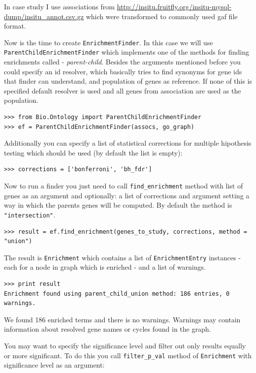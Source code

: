 \documentclass{report}
\begin{document}
In case study I use associations from \url{http://insitu.fruitfly.org/insitu-mysql-dump/insitu_annot.csv.gz}
which were transformed to commonly used gaf file format.

Now is the time to create \verb|EnrichmentFinder|. In this case we will
use \verb|ParentChildEnrichmentFinder| which implements one of the methods
for finding enrichments called - \emph{parent-child}. Besides the arguments
mentioned before you could specify an id resolver, which basically tries
to find synonyms for gene ids that finder can understand, and population
of genes as reference. If none of this is specified default resolver
is used and all genes from association are used as the population.

\begin{verbatim}
>>> from Bio.Ontology import ParentChildEnrichmentFinder
>>> ef = ParentChildEnrichmentFinder(assocs, go_graph)
\end{verbatim}

Additionally you can specify a list of statistical corrections for multiple
hipothesis testing which should be used (by default the list is empty):

\begin{verbatim}
>>> corrections = ['bonferroni', 'bh_fdr']
\end{verbatim}

Now to run a finder you just need to call \verb|find_enrichment| method with list
of genes as an argument and optionally: a list of corrections and argument
setting a way in which the parents genes will be computed. By default the method
is \verb|"intersection"|. 

\begin{verbatim}
>>> result = ef.find_enrichment(genes_to_study, corrections, method =  "union")
\end{verbatim}

The result is \verb|Enrichment| which contains a list of \verb|EnrichmentEntry|
instances - each for a node in graph which is enriched - and a list of warnings.

\begin{verbatim}
>>> print result
Enrichment found using parent_child_union method: 186 entries, 0 warnings.
\end{verbatim}

We found 186 enriched terms and there is no warnings. Warnings may contain
information about resolved gene names or cycles found in the graph.

You may want to specify the significance level and filter out only results
equally or more significant. To do this you call \verb|filter_p_val| method
of \verb|Enrichment| with significance level as an argument:
\end{document}
